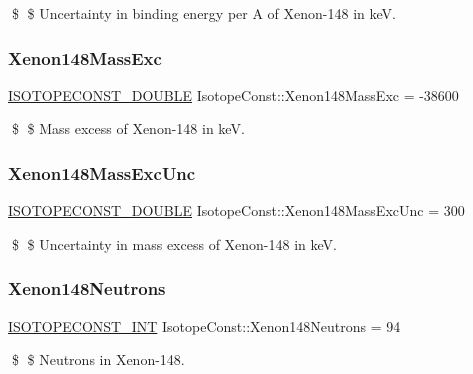 \$ \$ Uncertainty in binding energy per A of Xenon-\/148 in keV. \mbox{\label{group___isotope_const-_xenon-_xe148_ga53cfc8ae410673b4b4111c4837dca2fa}} 
\subsubsection{\texorpdfstring{Xenon148\+Mass\+Exc}{Xenon148MassExc}}
{\footnotesize\ttfamily \mbox{\hyperlink{group___isotope_const-_macros_ga8f45a7272ce02c0b4c65c44636ed719a}{I\+S\+O\+T\+O\+P\+E\+C\+O\+N\+S\+T\+\_\+\+D\+O\+U\+B\+LE}} Isotope\+Const\+::\+Xenon148\+Mass\+Exc = -\/38600}

\$ \$ Mass excess of Xenon-\/148 in keV. \mbox{\label{group___isotope_const-_xenon-_xe148_ga62507bc4946bdc926a1ab178cdca52ec}} 
\subsubsection{\texorpdfstring{Xenon148\+Mass\+Exc\+Unc}{Xenon148MassExcUnc}}
{\footnotesize\ttfamily \mbox{\hyperlink{group___isotope_const-_macros_ga8f45a7272ce02c0b4c65c44636ed719a}{I\+S\+O\+T\+O\+P\+E\+C\+O\+N\+S\+T\+\_\+\+D\+O\+U\+B\+LE}} Isotope\+Const\+::\+Xenon148\+Mass\+Exc\+Unc = 300}

\$ \$ Uncertainty in mass excess of Xenon-\/148 in keV. \mbox{\label{group___isotope_const-_xenon-_xe148_ga42bc3475fc14a5917648695441d64391}} 
\subsubsection{\texorpdfstring{Xenon148\+Neutrons}{Xenon148Neutrons}}
{\footnotesize\ttfamily \mbox{\hyperlink{group___isotope_const-_macros_ga5f18360b3e99483a35c32d789e62621c}{I\+S\+O\+T\+O\+P\+E\+C\+O\+N\+S\+T\+\_\+\+I\+NT}} Isotope\+Const\+::\+Xenon148\+Neutrons = 94}

\$ \$ Neutrons in Xenon-\/148. \mbox{\label{group___isotope_const-_xenon-_xe148_gada36f54c30eeaf634fae117cc7d56327}} 
